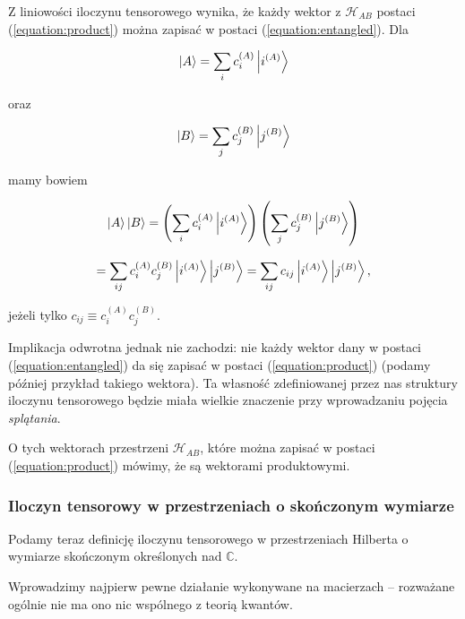 \begin{remark}
    \label{remark:classes}
    Z liniowości iloczynu tensorowego wynika, że każdy wektor z $\mathcal{H}_{AB}$ postaci (\ref{equation:product}) można zapisać w postaci (\ref{equation:entangled}). Dla

    $$
        \ket{A} = \sum\limits_{i} c_i ^ {(A)} \ket{i^{(A)}}
    $$

    oraz

    $$
        \ket{B} = \sum\limits_{j} c_j ^ {(B)} \ket{j^{(B)}}
    $$

    mamy bowiem

    $$
        \ket{A} \ket{B} = \left(\sum\limits_{i} c_i ^ {(A)} \ket{i^{(A)}}\right) \left(\sum\limits_{j} c_j ^ {(B)} \ket{j^{(B)}}\right)
    $$

    $$
        = \sum\limits_{ij} c_{i} ^ {(A)} c_{j} ^ {(B)} \ket{i ^ {(A)}} \ket{j ^ {(B)}} = \sum\limits_{ij} c_{ij} \ket{i ^ {(A)}} \ket{j ^ {(B)}},
    $$

    jeżeli tylko $c_{ij} \equiv c_{i} ^ {(A)} c_{j} ^ {(B)}$.

    Implikacja odwrotna jednak nie zachodzi: nie każdy wektor dany w postaci (\ref{equation:entangled}) da się zapisać w postaci (\ref{equation:product}) (podamy później przykład takiego wektora). Ta własność zdefiniowanej przez nas struktury iloczynu tensorowego będzie miała wielkie znaczenie przy wprowadzaniu pojęcia \textit{splątania}.
\end{remark}

\begin{remark}
    \label{remark:product-vector}
    O tych wektorach przestrzeni $\mathcal{H}_{AB}$, które można zapisać w postaci (\ref{equation:product}) mówimy, że są wektorami produktowymi.
\end{remark}

\subsubsection{Iloczyn tensorowy w przestrzeniach o skończonym wymiarze}

Podamy teraz definicję iloczynu tensorowego w przestrzeniach Hilberta o wymiarze skończonym określonych nad $\mathbb{C}$.

Wprowadzimy najpierw pewne działanie wykonywane na macierzach -- rozważane ogólnie nie ma ono nic wspólnego z teorią kwantów.

